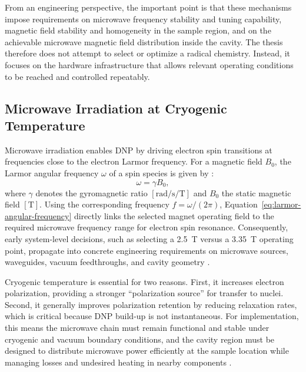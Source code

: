 \documentclass[FM,DP,EN,twoside]{tulthesis}
\begin{document}
From an engineering perspective, the important point is that these mechanisms impose requirements on microwave frequency stability and tuning capability, magnetic field stability and homogeneity in the sample region, and on the achievable microwave magnetic field distribution inside the cavity. The thesis therefore does not attempt to select or optimize a radical chemistry. Instead, it focuses on the hardware infrastructure that allows relevant operating conditions to be reached and controlled repeatably.

\subsection{Microwave Irradiation at Cryogenic Temperature}
\label{subsec:mw-irradiation-cryogenic}
Microwave irradiation enables DNP by driving electron spin transitions at frequencies close to the electron Larmor frequency. For a magnetic field $B_0$, the Larmor angular frequency $\omega$ of a spin species is given by \cite{larmor_ref}:
\begin{equation}
\omega = \gamma B_0,
\label{eq:larmor-angular-frequency}
\end{equation}
where $\gamma$ denotes the gyromagnetic ratio \([\si{\radian\per\second\per\tesla}]\) and $B_0$ the static magnetic field \([\si{\tesla}]\). Using the corresponding frequency $f=\omega/(2\pi)$, Equation~\ref{eq:larmor-angular-frequency} directly links the selected magnet operating field to the required microwave frequency range for electron spin resonance. Consequently, early system-level decisions, such as selecting a \SI{2.5}{\tesla} versus a \SI{3.35}{\tesla} operating point, propagate into concrete engineering requirements on microwave sources, waveguides, vacuum feedthroughs, and cavity geometry \cite{Kowalska2023MABudget}.

Cryogenic temperature is essential for two reasons. First, it increases electron polarization, providing a stronger ``polarization source'' for transfer to nuclei. Second, it generally improves polarization retention by reducing relaxation rates, which is critical because DNP build-up is not instantaneous. For implementation, this means the microwave chain must remain functional and stable under cryogenic and vacuum boundary conditions, and the cavity region must be designed to distribute microwave power efficiently at the sample location while managing losses and undesired heating in nearby components \cite{cryogenic_microwave_design_ref}.
\end{document}

